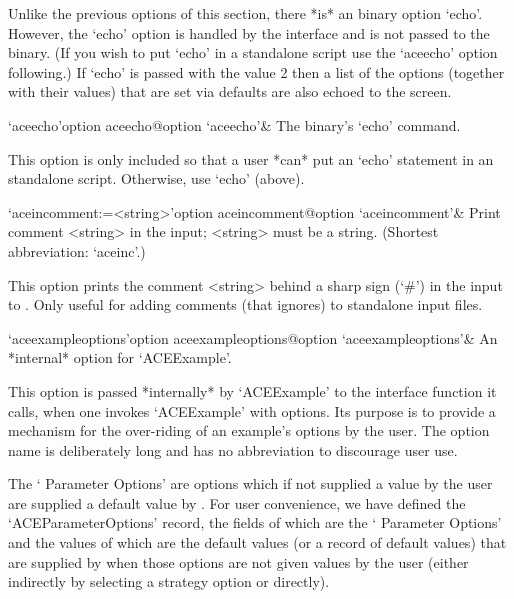 Unlike the previous options of this  section,  there  *is*  an  {\ACE}
binary option `echo'. However, the `echo' option  is  handled  by  the
{\ACE} interface and is not passed to the {\ACE} binary. (If you  wish
to put  `echo'  in  a  standalone  script  use  the  `aceecho'  option
following.) If `echo' is passed with the value 2 then a  list  of  the
options (together with their values) that are set via {\ACE}  defaults
are also echoed to the screen.

\>`aceecho'{option aceecho}@{option `aceecho'}& 
The {\ACE} binary's `echo' command.

This option is only included so  that  a  user  *can*  put  an  `echo'
statement in  an  {\ACE}  standalone  script.  Otherwise,  use  `echo'
(above).

\>`aceincomment:=<string>'{option aceincomment}@{option `aceincomment'}&
Print comment <string> in the {\ACE} input; <string> must be a string.
(Shortest abbreviation: `aceinc'.)

This option prints the comment <string> behind a sharp sign (`\#')  in
the input to {\ACE}. Only useful  for  adding  comments  (that  {\ACE}
ignores) to standalone input files.

\>`aceexampleoptions'{option aceexampleoptions}@{option `aceexampleoptions'}&
An *internal* option for `ACEExample'.

This option is passed  *internally*  by  `ACEExample'  to  the  {\ACE}
interface function  it  calls,  when  one  invokes  `ACEExample'  with
options. Its purpose is to provide a mechanism for the over-riding  of
an example's options by the user. The option name is deliberately long
and has no abbreviation to discourage user use.

\enditems


The \lq{}{\ACE} Parameter Options' are options which if not supplied a
value by the user are supplied a default value  by  {\ACE}.  For  user
convenience, we  have  defined  the  `ACEParameterOptions'{\undoquotes
{}}   record,   the
fields of which are the \lq{}{\ACE} Parameter Options' and the  values
of which are the default  values  (or  a  record  of  default  values)
that are supplied by {\ACE} when those options are not given values by
the  user  (either  indirectly  by  selecting  a  strategy  option  or
directly).

